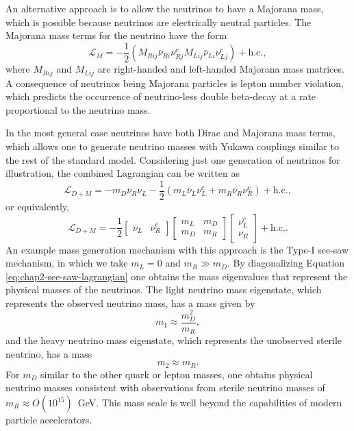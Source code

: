 An alternative approach is to allow the neutrinos to have a Majorana mass, which is possible because neutrinos are electrically neutral particles. The Majorana mass terms for the neutrino have the form 
\begin{equation}
    \mathcal{L}_{M}=-\frac{1}{2}(M_{Rij}\bar{\nu}_{Ri}\nu_{Rj}^c M_{Lij}\bar{\nu}_{Li}\nu_{Lj}^c) +\textrm{h.c.},
\end{equation}
where $M_{Rij}$ and $M_{Lij}$ are right-handed and left-handed Majorana mass matrices. A consequence of neutrinos being Majorana particles is lepton number violation, which predicts the occurrence of neutrino-less double beta-decay at a rate proportional to the neutrino mass.

In the most general case neutrinos have both Dirac and Majorana mass terms, which allows one to generate neutrino masses with Yukawa couplings similar to the rest of the standard model. Considering just one generation of neutrinos for illustration, the combined Lagrangian can be written as 
\begin{equation}
    \mathcal{L}_{D+M}=-m_D\bar{\nu}_{R}\nu_{L} - \frac{1}{2}(m_L\bar{\nu}_L\nu_L^c+m_R\bar{\nu}_R\nu_R^c)+\text{h.c.},
\end{equation}
or equivalently,
\begin{equation}
    \label{eq:chap2-see-saw-lagrangian}
    \mathcal{L}_{D+M}=-\frac{1}{2}\begin{bmatrix}\bar{\nu}_L&\bar{\nu}^c_R\end{bmatrix}\begin{bmatrix}m_L&m_D\\m_D&m_R\end{bmatrix}\begin{bmatrix}\nu^c_L\\ \nu_R\end{bmatrix} + \text{h.c.}.
\end{equation}
An example mass generation mechanism with this approach is the Type-I see-saw mechanism, in which we take $m_L=0$ and $m_R\gg m_D$. By diagonalizing Equation \ref{eq:chap2-see-saw-lagrangian} one obtains the mass eigenvalues that represent the physical masses of the neutrinos. The light neutrino mass eigenstate, which represents the observed neutrino mass, has a mass given by
\begin{equation}
    m_1\approx\frac{m_D^2}{m_R},
\end{equation}
and the heavy neutrino mass eigenstate, which represents the unobserved sterile neutrino, has a mass
\begin{equation}
    m_2\approx m_R.
\end{equation}
For $m_D$ similar to the other quark or lepton masses, one obtains physical neutrino masses consistent with observations from sterile neutrino masses of $m_R\approx O(10^{15})$~GeV. This mass scale is well beyond the capabilities of modern particle accelerators. 

